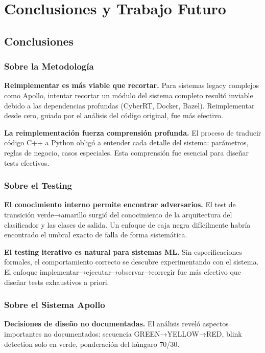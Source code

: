 \chapter{Conclusiones y Trabajo Futuro}
\label{cap:conclusiones}

\section{Conclusiones}

\subsection{Sobre la Metodología}

\textbf{Reimplementar es más viable que recortar.} Para sistemas legacy complejos como Apollo, intentar recortar un módulo del sistema completo resultó inviable debido a las dependencias profundas (CyberRT, Docker, Bazel). Reimplementar desde cero, guiado por el análisis del código original, fue más efectivo.

\textbf{La reimplementación fuerza comprensión profunda.} El proceso de traducir código C++ a Python obligó a entender cada detalle del sistema: parámetros, reglas de negocio, casos especiales. Esta comprensión fue esencial para diseñar tests efectivos.

\subsection{Sobre el Testing}

\textbf{El conocimiento interno permite encontrar adversarios.} El test de transición verde→amarillo surgió del conocimiento de la arquitectura del clasificador y las clases de salida. Un enfoque de caja negra difícilmente habría encontrado el umbral exacto de falla de forma sistemática.

\textbf{El testing iterativo es natural para sistemas ML.} Sin especificaciones formales, el comportamiento correcto se descubre experimentando con el sistema. El enfoque implementar→ejecutar→observar→corregir fue más efectivo que diseñar tests exhaustivos a priori.

\subsection{Sobre el Sistema Apollo}

\textbf{Decisiones de diseño no documentadas.} El análisis reveló aspectos importantes no documentados: secuencia GREEN→YELLOW→RED, blink detection solo en verde, ponderación del húngaro 70/30.

